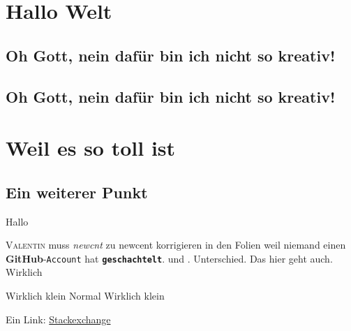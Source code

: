     \section{Hallo Welt}
    \subsection{Oh Gott, nein dafür bin ich nicht so kreativ!}
    \blindtext[1]
    \subsection[omg]{Oh Gott, nein dafür bin ich nicht so kreativ!}
        \blindtext[1]
    \section{Weil es so toll ist}
    \subsection{Ein weiterer Punkt}
    Hallo
    
    
    \textsc{Valentin} muss \textit{newcnt} zu newcent korrigieren in den Folien
    weil niemand einen \textbf{GitHub}-\texttt{Account} hat
    \textbf{\texttt{geschachtelt}}.  und \sffamily. Unterschied. \textsf{Das hier geht auch}. Wirklich
     
    \tiny Wirklich klein
    \normalsize Normal
    \tiny{Wirklich klein}
    
    \normalsize
    \rmfamily
    
    Ein Link: \href{http://tex.stackexhange.com}{Stackexchange}
    
    \begin{flushright}
    \blindtext
    \end{flushright}
    \begin{center}
    \blindtext
    \end{center}
    \begin{flushleft}
    \blindtext
    \end{flushleft}
     
